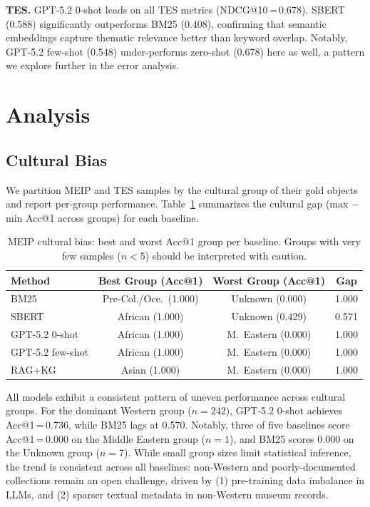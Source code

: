 \documentclass[11pt]{article}
\begin{document}
\noindent\textbf{TES.}
GPT-5.2 0-shot leads on all TES metrics (NDCG@10\,=\,0.678).
SBERT (0.588) significantly outperforms BM25 (0.408), confirming that
semantic embeddings capture thematic relevance better than keyword overlap.
Notably, GPT-5.2 few-shot (0.548) under-performs zero-shot (0.678) here as
well, a pattern we explore further in the error analysis.

\section{Analysis}
\label{sec:analysis}

\subsection{Cultural Bias}
\label{sec:cultural_bias}

We partition MEIP and TES samples by the cultural group of their gold objects
and report per-group performance.
Table~\ref{tab:bias} summarizes the cultural gap (max $-$ min Acc@1 across
groups) for each baseline.

\begin{table}[h]
\centering
\small
\begin{tabular}{lccc}
\toprule
\textbf{Method} & \textbf{Best Group (Acc@1)} & \textbf{Worst Group (Acc@1)} & \textbf{Gap} \\
\midrule
BM25             & Pre-Col./Oce.\ (1.000) & Unknown (0.000) & 1.000 \\
SBERT            & African (1.000)        & Unknown (0.429) & 0.571 \\
GPT-5.2 0-shot   & African (1.000)        & M.\ Eastern (0.000) & 1.000 \\
GPT-5.2 few-shot & African (1.000)        & M.\ Eastern (0.000) & 1.000 \\
RAG+KG           & Asian (1.000)          & M.\ Eastern (0.000) & 1.000 \\
\bottomrule
\end{tabular}
\caption{MEIP cultural bias: best and worst Acc@1 group per baseline.
  Groups with very few samples ($n{<}5$) should be interpreted with caution.}
\label{tab:bias}
\end{table}

All models exhibit a consistent pattern of uneven performance across cultural
groups.
For the dominant Western group ($n{=}242$), GPT-5.2 0-shot achieves
Acc@1\,=\,0.736, while BM25 lags at 0.570.
Notably, three of five baselines score Acc@1\,=\,0.000 on the Middle Eastern
group ($n{=}1$), and BM25 scores 0.000 on the Unknown group ($n{=}7$).
While small group sizes limit statistical inference, the trend is consistent
across all baselines: non-Western and poorly-documented collections remain an
open challenge, driven by (1) pre-training data imbalance in LLMs, and
(2) sparser textual metadata in non-Western museum records.
\end{document}
